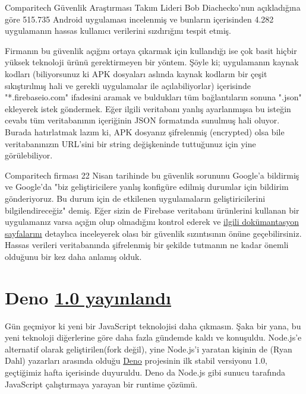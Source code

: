 \documentclass[11pt]{article}
\begin{document}
Comparitech Güvenlik Araştırması Takım Lideri Bob Diachecko'nun açıkladığına
göre 515.735 Android uygulaması incelenmiş ve bunların içerisinden 4.282
uygulamanın hassas kullanıcı verilerini sızdırığını tespit etmiş.

Firmanın bu güvenlik açığını ortaya çıkarmak için kullandığı ise çok basit
hiçbir yüksek teknoloji ürünü gerektirmeyen bir yöntem. Şöyle ki; uygulamanın
kaynak kodları (biliyorsunuz ki APK dosyaları aslında kaynak kodların bir
çeşit sıkıştırılmış hali ve gerekli uygulamalar ile açılabiliyorlar)
içerisinde "*.firebaseio.com" ifadesini aramak ve buldukları tüm bağlantıların
sonuna ".json" ekleyerek istek göndermek. Eğer ilgili veritabanı yanlış
ayarlanmışsa bu isteğin cevabı tüm veritabanının içeriğinin JSON formatında
sunulmuş hali oluyor. Burada hatırlatmak lazım ki, APK dosyanız şifrelenmiş
(encrypted) olsa bile veritabanınızın URL'sini bir string değişkeninde
tuttuğunuz için yine görülebiliyor.

Comparitech firması 22 Nisan tarihinde bu güvenlik sorununu Google'a bildirmiş
ve Google'da "biz geliştiricilere yanlış konfigüre edilmiş durumlar için
bildirim gönderiyoruz. Bu durum için de etkilenen uygulamaların
geliştiricilerini bilgilendireceğiz" demiş. Eğer sizin de Firebase veritabanı
ürünlerini kullanan bir uygulamanız varsa açığın olup olmadığını kontrol
ederek ve \href{https://firebase.google.com/docs/database/security}{ilgili dokümantasyon sayfalarını} detaylıca inceleyerek olası bir
güvenlik sızıntısının önüne geçebilirsiniz. Hassas verileri veritabanında
şifrelenmiş bir şekilde tutmanın ne kadar önemli olduğunu bir kez daha anlamış
olduk.
\section{Deno \href{https://deno.land/v1}{1.0 yayınlandı}}
\label{sec:orged90bc7}
Gün geçmiyor ki yeni bir JavaScript teknolojisi daha çıkmasın. Şaka bir yana,
bu yeni teknoloji diğerlerine göre daha fazla gündemde kaldı ve konuşuldu.
Node.js'e alternatif olarak geliştirilen(fork değil), yine Node.js'i yaratan
kişinin de (Ryan Dahl) yazarları arasında olduğu \href{https://deno.land/}{Deno} projesinin ilk stabil
versiyonu 1.0, geçtiğimiz hafta içerisinde duyuruldu. Deno da Node.js gibi
sunucu tarafında JavaScript çalıştırmaya yarayan bir runtime çözümü.
\end{document}
